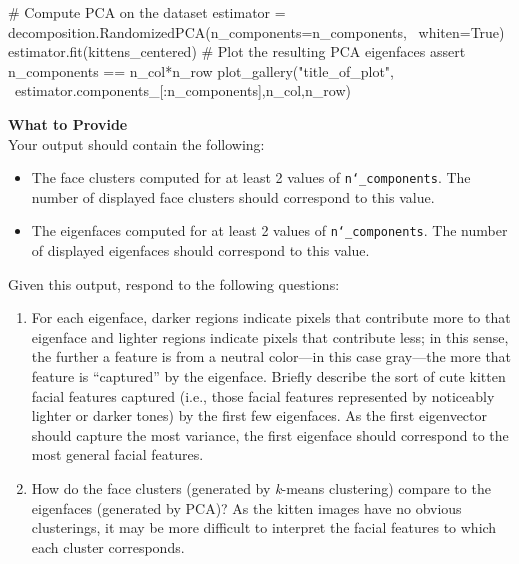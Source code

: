\documentclass[paper=a4, fontsize=11pt]{scrartcl} %
\numberwithin{equation}{section} %
\numberwithin{figure}{section} %
\numberwithin{table}{section} %
\begin{document}
\vspace{6pt}

\begin{adjustbox}{minipage=0.8\textwidth,margin=0pt \smallskipamount,center}
\begin{python}
# Compute PCA on the dataset
estimator = decomposition.RandomizedPCA(n_components=n_components, \
                                        whiten=True)
estimator.fit(kittens_centered)
# Plot the resulting PCA eigenfaces
assert n_components == n_col*n_row
plot_gallery("title_of_plot", \
             estimator.components_[:n_components],n_col,n_row)
\end{python}
\end{adjustbox}

\vspace{8pt}

\textbf{What to Provide}\\
Your output should contain the following:
\begin{itemize}
\item The face clusters computed for at least 2 values of \texttt{n\char`_components}. The number of displayed face clusters should correspond to this value.
\item The eigenfaces computed for at least 2 values of \texttt{n\char`_components}. The number of displayed eigenfaces should correspond to this value.
\end{itemize}
Given this output, respond to the following questions:
\begin{enumerate}
\item For each eigenface, darker regions indicate pixels that contribute more to that eigenface and lighter regions indicate pixels that contribute less; in this sense, the further a feature  is from a neutral color---in this case gray---the more that feature is ``captured'' by the eigenface. Briefly describe the sort of cute kitten facial features captured (i.e., those facial features represented by noticeably lighter or darker tones) by the first few eigenfaces. As the first eigenvector should capture the most variance, the first eigenface should correspond to the most general facial features.
\item How do the face clusters (generated by \textit{k}-means clustering) compare to the eigenfaces (generated by PCA)? As the kitten images have no obvious clusterings, it may be more difficult to interpret the facial features to  which each cluster corresponds.
\end{enumerate}
\end{document}
